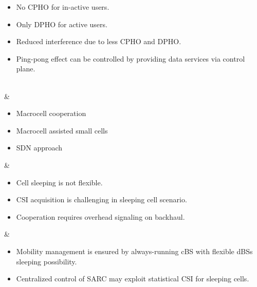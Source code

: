 \documentclass[article,10pt,twocolumn]{IEEEtran}
\begin{document}
\begin{table*}[!htb]
\begin{tcolorbox}[tab3,tabularx={>{\raggedright\arraybackslash}p{0.6in}||>{\raggedright\arraybackslash}p{1.3in}||X||X}]
\begin{itemize}[leftmargin=1.25em]
																																										\item No CPHO for in-active users.
     																																										\item Only DPHO for active users.
     																																										\item Reduced interference due to less CPHO and DPHO.
     																																										\item Ping-pong effect can be controlled by providing data services via control plane.
																																										\vspace*{-\baselineskip}
																																									\end{itemize}						\\ \hline 
{} 
											& \compress \begin{itemize}[leftmargin=1.25em]
												\renewcommand{\labelitemi}{$\Rightarrow$} 
												\vspace*{4mm} 
												\item Macrocell cooperation
												\item Macrocell assisted small cells 
												\item SDN approach
												\vspace*{-\baselineskip} 
											\end{itemize}
																					&\compress\begin{itemize}[leftmargin=1.25em]
																						\renewcommand{\labelitemi}{$\Rightarrow$}
																						\item Cell sleeping is not flexible.
			      																			\item CSI acquisition is challenging in sleeping cell scenario.
			      																			\item Cooperation requires overhead signaling on backhaul. 
																						\vspace*{-\baselineskip}
																					\end{itemize}														
																																									& \compress\begin{itemize}[leftmargin=1.25em]
																																										\renewcommand{\labelitemi}{$\Rightarrow$}
																																										\item Mobility management is ensured by always-running cBS with flexible dBSs sleeping possibility.
      																																										\item Centralized control of SARC may exploit statistical CSI for sleeping cells.

\end{itemize}
\end{tcolorbox}
\end{table*}
\end{document}
